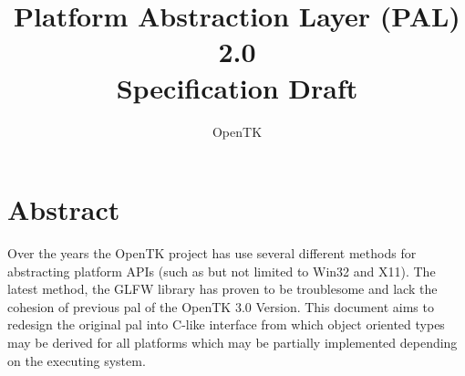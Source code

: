 \documentclass[a4paper, 12pt]{article}
\title{
    Platform Abstraction Layer (PAL) 2.0\\
    {\large Specification Draft}
}
\author{OpenTK}
\begin{document}
\maketitle

\section*{Abstract}
Over the years the OpenTK project has use several different methods for
abstracting platform APIs (such as but not limited to Win32 and X11). The latest
method, the GLFW library has proven to be troublesome and lack the cohesion of
previous \gls{pal} of the OpenTK 3.0 Version. This document aims to redesign the
original \gls{pal} into C-like interface from which object oriented types may be
derived for all platforms which may be partially implemented depending on the
executing system.

\tableofcontents
\clearpage

\setcounter{page}{1}



\clearpage

\printglossaries
{}
\end{document}
